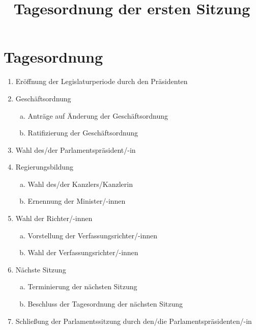 \documentclass{sasbase}
\begin{document}
\title{Tagesordnung der ersten Sitzung}
\setcounter{secnumdepth}{5}
\onecolumn
\mytitle
\parensstyle

\vspace*{-5mm}
\section{Tagesordnung}
\vspace*{5mm}

\begin{enumerate}
    \item Eröffnung der Legislaturperiode durch den Präsidenten
    \item Geschäftsordnung
        \begin{enumerate}[a.]
            \item Anträge auf Änderung der Geschäftsordnung
            \item Ratifizierung der Geschäftsordnung
        \end{enumerate}
    \item Wahl des/der Parlamentspräsident/-in
    \item Regierungsbildung
        \begin{enumerate}[a.]
            \item Wahl des/der Kanzlers/Kanzlerin
            \item Ernennung der Minister/-innen
        \end{enumerate}
    \item Wahl der Richter/-innen
        \begin{enumerate}[a.]
            \item Vorstellung der Verfassungsrichter/-innen
            \item Wahl der Verfassungsrichter/-innen
        \end{enumerate}
    \item Nächste Sitzung
        \begin{enumerate}[a.]
            \item Terminierung der nächsten Sitzung
            \item Beschluss der Tagesordnung der nächsten Sitzung
        \end{enumerate}
    \item Schließung der Parlamentssitzung durch den/die Parlamentspräsidenten/-in
\end{enumerate}
\end{document}
